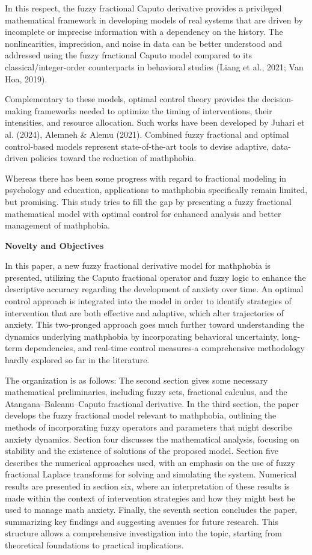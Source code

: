 In this respect, the fuzzy fractional Caputo derivative provides a privileged mathematical framework in developing models of real systems that are driven by incomplete or imprecise information with a dependency on the history. The nonlinearities, imprecision, and noise in data can be better understood and addressed using the fuzzy fractional Caputo model compared to its classical/integer-order counterparts in behavioral studies (Liang et al., 2021; Van Hoa, 2019).

Complementary to these models, optimal control theory provides the decision-making frameworks needed to optimize the timing of interventions, their intensities, and resource allocation. Such works have been developed by Juhari et al. (2024), Alemneh \& Alemu (2021). Combined fuzzy fractional and optimal control-based models represent state-of-the-art tools to devise adaptive, data-driven policies toward the reduction of mathphobia.

Whereas there has been some progress with regard to fractional modeling in psychology and education, applications to mathphobia specifically remain limited, but promising. This study tries to fill the gap by presenting a fuzzy fractional mathematical model with optimal control for enhanced analysis and better management of mathphobia.

\textbf{Novelty and Objectives}

In this paper, a new fuzzy fractional derivative model for mathphobia is presented, utilizing the Caputo fractional operator and fuzzy logic to enhance the descriptive accuracy regarding the development of anxiety over time. An optimal control approach is integrated into the model in order to identify strategies of intervention that are both effective and adaptive, which alter trajectories of anxiety. This two-pronged approach goes much further toward understanding the dynamics underlying mathphobia by incorporating behavioral uncertainty, long-term dependencies, and real-time control measures-a comprehensive methodology hardly explored so far in the literature.

The organization is as follows: The second section gives some necessary mathematical preliminaries, including fuzzy sets, fractional calculus, and the Atangana--Baleanu--Caputo fractional derivative. In the third section, the paper develops the fuzzy fractional model relevant to mathphobia, outlining the methods of incorporating fuzzy operators and parameters that might describe anxiety dynamics. Section four discusses the mathematical analysis, focusing on stability and the existence of solutions of the proposed model. Section five describes the numerical approaches used, with an emphasis on the use of fuzzy fractional Laplace transforms for solving and simulating the system. Numerical results are presented in section six, where an interpretation of these results is made within the context of intervention strategies and how they might best be used to manage math anxiety. Finally, the seventh section concludes the paper, summarizing key findings and suggesting avenues for future research. This structure allows a comprehensive investigation into the topic, starting from theoretical foundations to practical implications.

